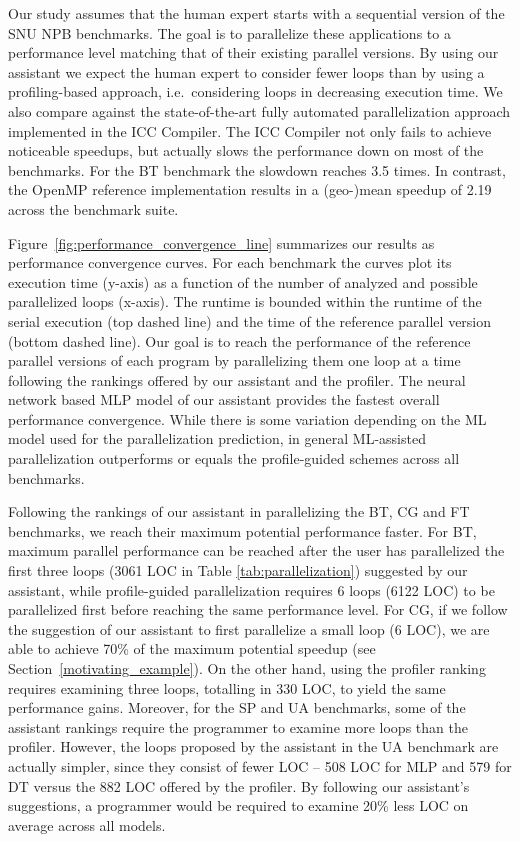 Our study assumes that the human expert starts with a sequential version of the SNU NPB benchmarks. The goal
is to parallelize these applications to a performance level matching that of their existing parallel versions.
By using our assistant we expect the human expert to consider fewer loops than by using a profiling-based approach, i.e.\ considering loops in decreasing execution time. We also compare against the state-of-the-art fully automated parallelization approach implemented in the ICC Compiler. The ICC Compiler not only fails to achieve noticeable speedups, but actually slows the performance down on most of the benchmarks. For the BT benchmark the slowdown reaches 3.5 times. In contrast, the OpenMP reference implementation results in a \mbox{(geo-)mean} speedup of 2.19 across the benchmark suite.

Figure~\ref{fig:performance_convergence_line} summarizes our results as
performance convergence curves. For each benchmark the curves plot its execution
time (y-axis) as a function of the number of analyzed and possible parallelized
loops (x-axis). The runtime is bounded within the runtime of the serial
execution (top dashed line) and the time of the reference parallel version (bottom
dashed line). Our goal is to reach the performance of the reference parallel
versions of each program by parallelizing them one loop at a time following the
rankings offered by our assistant and the profiler. The neural network based MLP
model of our assistant provides the fastest overall performance
convergence. While there is some variation depending on the ML model used for
the parallelization prediction, in general ML-assisted parallelization
outperforms or equals the profile-guided schemes across all benchmarks.

Following the rankings of our assistant in parallelizing the BT, CG and FT
benchmarks, we reach their maximum potential performance faster. For BT, maximum
parallel performance can be reached after the user has parallelized the first three 
loops (3061 LOC in Table \ref{tab:parallelization}) suggested by our assistant, while profile-guided parallelization requires 6 loops (6122 LOC) to be parallelized first before reaching the same performance
level. For CG, if we follow the suggestion of our assistant to first parallelize
a small loop (6 LOC), we are able to achieve 70\% of the
maximum potential speedup (see Section~\ref{motivating_example}). On the other
hand, using the profiler ranking requires examining three loops, totalling in
330 LOC, to yield the same performance gains. Moreover, for the SP and UA
benchmarks, some of the assistant rankings require the programmer to examine
more loops than the profiler. However, the loops proposed by the assistant in
the UA benchmark are actually simpler, since they consist of fewer LOC -- 508
LOC for MLP and 579 for DT versus the 882 LOC offered by the profiler. By following our assistant's suggestions, a
programmer would be required to examine 20\% less LOC on average across all models.


